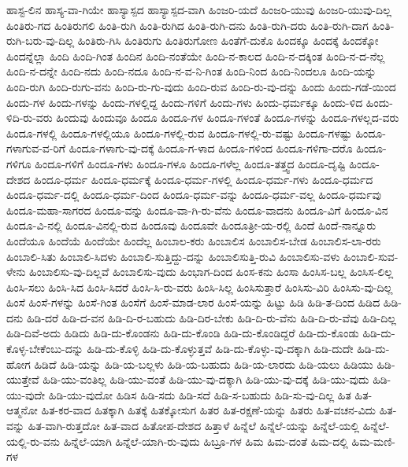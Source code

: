 {ಹಾಸ್ಟ-ಲಿನ
ಹಾಸ್ಯ-ವಾ-ಗಿಯೇ
ಹಾಸ್ಯಾಸ್ಪದ
ಹಾಸ್ಯಾಸ್ಪದ-ವಾಗಿ
ಹಿಂಜರಿ-ಯದೆ
ಹಿಂಜರಿ-ಯುವು
ಹಿಂಜರಿ-ಯುವು-ದಿಲ್ಲ
ಹಿಂತಿರು-ಗದ
ಹಿಂತಿರುಗಲಿ
ಹಿಂತಿ-ರುಗಿ
ಹಿಂತಿ-ರುಗಿದ
ಹಿಂತಿ-ರುಗಿ-ದನು
ಹಿಂತಿ-ರುಗಿ-ದರು
ಹಿಂತಿ-ರುಗಿ-ದಾಗ
ಹಿಂತಿ-ರುಗಿ-ಬರು-ವು-ದಿಲ್ಲ
ಹಿಂತಿರು-ಗಿಸಿ
ಹಿಂತಿರುಗು
ಹಿಂತಿರುಗೋಣ
ಹಿಂತೆಗೆ-ದುಕೊ
ಹಿಂದಕ್ಕೂ
ಹಿಂದಕ್ಕೆ
ಹಿಂದಕ್ಕೋ
ಹಿಂದನ್ನೆಲ್ಲಾ
ಹಿಂದಿ
ಹಿಂದಿ-ಗಿಂತ
ಹಿಂದಿನ
ಹಿಂದಿ-ನಂತೆಯೇ
ಹಿಂದಿ-ನ-ಕಾಲದ
ಹಿಂದಿ-ನ-ದಕ್ಕಿಂತ
ಹಿಂದಿ-ನ-ದ-ನೆಲ್ಲ
ಹಿಂದಿ-ನ-ದನ್ನೇ
ಹಿಂದಿ-ನದು
ಹಿಂದಿ-ನದೂ
ಹಿಂದಿ-ನ-ವ-ನಿ-ಗಿಂತ
ಹಿಂದಿ-ನಿಂದ
ಹಿಂದಿ-ನಿಂದಲೂ
ಹಿಂದಿ-ಯನ್ನು
ಹಿಂದಿ-ರುಗಿ
ಹಿಂದಿ-ರುಗು-ವನು
ಹಿಂದಿ-ರು-ಗು-ವುದು
ಹಿಂದಿ-ರುವ
ಹಿಂದಿ-ರು-ವು-ದನ್ನು
ಹಿಂದು
ಹಿಂದು-ಗಡೆ-ಯಿಂದ
ಹಿಂದು-ಗಳ
ಹಿಂದು-ಗಳನ್ನು
ಹಿಂದು-ಗಳಲ್ಲಿದ್ದ
ಹಿಂದು-ಗಳಿಗೆ
ಹಿಂದು-ಗಳು
ಹಿಂದು-ಧರ್ಮಕ್ಕೂ
ಹಿಂದು-ಳಿದ
ಹಿಂದು-ಳಿದಿ-ರು-ವರು
ಹಿಂದುವು
ಹಿಂದುವೂ
ಹಿಂದೂ
ಹಿಂದೂ-ಗಳ
ಹಿಂದೂ-ಗಳಂತೆ
ಹಿಂದೂ-ಗಳನ್ನು
ಹಿಂದೂ-ಗಳಲ್ಲದ-ವರು
ಹಿಂದೂ-ಗಳಲ್ಲಿ
ಹಿಂದೂ-ಗಳಲ್ಲಿಯೂ
ಹಿಂದೂ-ಗಳಲ್ಲಿ-ರುವ
ಹಿಂದೂ-ಗಳಲ್ಲಿ-ರು-ವಷ್ಟು
ಹಿಂದೂ-ಗಳಷ್ಟು
ಹಿಂದೂ-ಗಳಾಗುವ-ವ-ರಿಗೆ
ಹಿಂದೂ-ಗಳಾಗು-ವು-ದಕ್ಕೆ
ಹಿಂದೂ-ಗ-ಳಾದ
ಹಿಂದೂ-ಗಳಿಂದ
ಹಿಂದೂ-ಗಳಿಗಾ-ದರೊ
ಹಿಂದೂ-ಗಳಿಗೂ
ಹಿಂದೂ-ಗಳಿಗೆ
ಹಿಂದೂ-ಗಳು
ಹಿಂದೂ-ಗಳೂ
ಹಿಂದೂ-ಗಳೆಲ್ಲ
ಹಿಂದೂ-ತತ್ತ್ವದ
ಹಿಂದೂ-ದೃಷ್ಟಿ
ಹಿಂದೂ-ದೇಶದ
ಹಿಂದೂ-ಧರ್ಮ
ಹಿಂದೂ-ಧರ್ಮಕ್ಕೆ
ಹಿಂದೂ-ಧರ್ಮ-ಗಳಲ್ಲಿ
ಹಿಂದೂ-ಧರ್ಮ-ಗಳು
ಹಿಂದೂ-ಧರ್ಮದ
ಹಿಂದೂ-ಧರ್ಮ-ದಲ್ಲಿ
ಹಿಂದೂ-ಧರ್ಮ-ದಿಂದ
ಹಿಂದೂ-ಧರ್ಮ-ವನ್ನು
ಹಿಂದೂ-ಧರ್ಮ-ವಲ್ಲ
ಹಿಂದೂ-ಧರ್ಮವು
ಹಿಂದೂ-ಮಹಾ-ಸಾಗರದ
ಹಿಂದೂ-ವನ್ನು
ಹಿಂದೂ-ವಾ-ಗಿ-ರು-ವೆನು
ಹಿಂದೂ-ವಾದನು
ಹಿಂದೂ-ವಿಗೆ
ಹಿಂದೂ-ವಿನ
ಹಿಂದೂ-ವಿ-ನಲ್ಲಿ
ಹಿಂದೂ-ವಿನಲ್ಲಿ-ರುವ
ಹಿಂದೂವು
ಹಿಂದೂವೇ
ಹಿಂದೂತ್ರೀ-ಯ-ರಲ್ಲಿ
ಹಿಂದೆ
ಹಿಂದೆ-ನಾನ್ನೂರು
ಹಿಂದೆಯೂ
ಹಿಂದೆಯೆ
ಹಿಂದೆಯೇ
ಹಿಂದೆಲ್ಲ
ಹಿಂಬಾಲ-ಕರು
ಹಿಂಬಾಲಿಸ
ಹಿಂಬಾಲಿಸ-ಬೇಡ
ಹಿಂಬಾಲಿಸ-ಲಾ-ರರು
ಹಿಂಬಾಲಿ-ಸಿತು
ಹಿಂಬಾಲಿ-ಸಿದಳು
ಹಿಂಬಾಲಿ-ಸುತ್ತಿದ್ದು-ದನ್ನು
ಹಿಂಬಾಲಿಸುತ್ತಿ-ರುವಿ
ಹಿಂಬಾಲಿಸು-ವಳು
ಹಿಂಬಾಲಿ-ಸುವ-ಳೇನು
ಹಿಂಬಾಲಿಸು-ವು-ದಿಲ್ಲವೆ
ಹಿಂಬಾಲಿಸು-ವುದು
ಹಿಂಭಾಗ-ದಿಂದ
ಹಿಂಸ-ಕನು
ಹಿಂಸಾ
ಹಿಂಸಿಸ-ಬಲ್ಲ
ಹಿಂಸಿಸ-ಲಿಲ್ಲ
ಹಿಂಸಿ-ಸಲು
ಹಿಂಸಿ-ಸಿದ
ಹಿಂಸಿ-ಸಿದರೆ
ಹಿಂಸಿ-ಸಿ-ರು-ವರು
ಹಿಂಸಿ-ಸಿಲ್ಲ
ಹಿಂಸಿಸುತ್ತಾರೆ
ಹಿಂಸಿಸು-ವಿರಿ
ಹಿಂಸಿಸು-ವು-ದಿಲ್ಲ
ಹಿಂಸೆ
ಹಿಂಸೆ-ಗಳನ್ನು
ಹಿಂಸೆ-ಗಿಂತ
ಹಿಂಸೆಗೆ
ಹಿಂಸೆ-ಮಾಡ-ಲಾರ
ಹಿಂಸೆ-ಯನ್ನು
ಹಿಟ್ಟು
ಹಿಡಿ
ಹಿಡಿ-ತ-ದಿಂದ
ಹಿಡಿದ
ಹಿಡಿ-ದನು
ಹಿಡಿ-ದರೆ
ಹಿಡಿ-ದ-ವನ
ಹಿಡಿ-ದಿ-ರ-ಬಹುದು
ಹಿಡಿ-ದಿರ-ಬೇಕು
ಹಿಡಿ-ದಿ-ರು-ವೆನು
ಹಿಡಿ-ದಿ-ರು-ವೆವು
ಹಿಡಿ-ದಿಲ್ಲ
ಹಿಡಿ-ದಿವೆ-ಅದು
ಹಿಡಿದು
ಹಿಡಿ-ದು-ಕೊಂಡನು
ಹಿಡಿ-ದು-ಕೊಂಡಿ
ಹಿಡಿ-ದು-ಕೊಂಡಿದ್ದರೆ
ಹಿಡಿ-ದು-ಕೊಂಡು
ಹಿಡಿ-ದು-ಕೊಳ್ಳ-ಬೇಕೆಂಬು-ದನ್ನು
ಹಿಡಿ-ದು-ಕೊಳ್ಳಿ
ಹಿಡಿ-ದು-ಕೊಳ್ಳುತ್ತವೆ
ಹಿಡಿ-ದು-ಕೊಳ್ಳು-ವು-ದಕ್ಕಾಗಿ
ಹಿಡಿ-ದುದೇ
ಹಿಡಿ-ದು-ಹೋಗ
ಹಿಡಿದೆ
ಹಿಡಿ-ಯನ್ನು
ಹಿಡಿ-ಯ-ಬಲ್ಲಳು
ಹಿಡಿ-ಯ-ಬಹುದು
ಹಿಡಿ-ಯ-ಲಾರದು
ಹಿಡಿ-ಯಲು
ಹಿಡಿಯು
ಹಿಡಿ-ಯುತ್ತೇವೆ
ಹಿಡಿ-ಯು-ವಂತಿಲ್ಲ
ಹಿಡಿ-ಯು-ವಂತೆ
ಹಿಡಿ-ಯು-ವು-ದಕ್ಕಾಗಿ
ಹಿಡಿ-ಯು-ವು-ದಕ್ಕೆ
ಹಿಡಿ-ಯು-ವುದು
ಹಿಡಿ-ಯು-ವುದೇ
ಹಿಡಿ-ಯು-ವುದೋ
ಹಿಡಿಸ
ಹಿಡಿ-ಸದು
ಹಿಡಿ-ಸದೆ
ಹಿಡಿ-ಸ-ಬಹುದು
ಹಿಡಿ-ಸು-ವು-ದಿಲ್ಲ
ಹಿತ
ಹಿತ-ಆತ್ಮನೋ
ಹಿತ-ಕರ-ವಾದ
ಹಿತಕ್ಕಾಗಿ
ಹಿತಕ್ಕೆ
ಹಿತಕ್ಕೋಸುಗ
ಹಿತರ
ಹಿತ-ರಕ್ಷಣೆ-ಯನ್ನು
ಹಿತರು
ಹಿತ-ವಚನ-ವಿದು
ಹಿತ-ವನ್ನು
ಹಿತ-ವಾಗಿ-ರುತ್ತದೋ
ಹಿತ-ವಾದ
ಹಿತೋಪ-ದೇಶದ
ಹಿತ್ತಾಳೆ
ಹಿನ್ನೆಲೆ
ಹಿನ್ನೆಲೆ-ಯನ್ನು
ಹಿನ್ನೆಲೆ-ಯಲ್ಲಿ
ಹಿನ್ನೆಲೆ-ಯಲ್ಲಿ-ರು-ವನು
ಹಿನ್ನೆಲೆ-ಯಾಗಿ
ಹಿನ್ನೆಲೆ-ಯಾಗಿ-ರು-ವುದು
ಹಿಬ್ರೂ-ಗಳ
ಹಿಮ
ಹಿಮ-ದಂತೆ
ಹಿಮ-ದಲ್ಲಿ
ಹಿಮ-ಮಣಿ-ಗಳ
}
